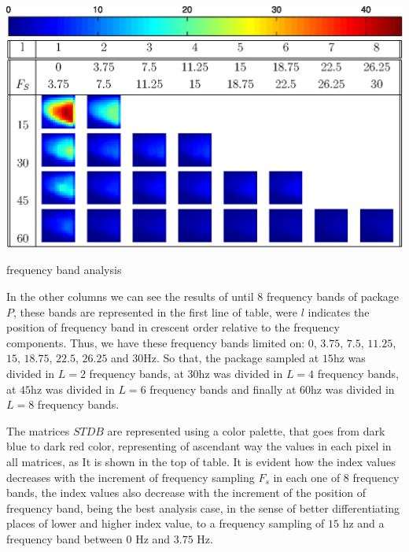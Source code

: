 \documentclass[review]{elsarticle}
\begin{document}
\begin{table}[h!]
\includegraphics[width=\textwidth]{colorbar.eps}
\includegraphics[width=\textwidth]{freq1.eps}
\caption{frequency band analysis}
\label{table:2}
\end{table}
In the other columns we can see the results of until $8$ frequency bands of package $P$,
these bands are represented in the first line of table, were $l$ indicates the position of frequency band
in crescent order relative to the frequency components. Thus, we have 
these frequency bands limited on: $0$, $3.75$, $7.5$, $11.25$, $15$, $18.75$, $22.5$, $26.25$ and $30$Hz.
So that, the package sampled at $15$hz was divided in $L=2$ frequency bands, 
at $30$hz was divided in $L=4$ frequency bands, 
at $45$hz was divided in $L=6$ frequency bands and finally
at $60$hz was divided in $L=8$ frequency bands.

The matrices $STDB$ are represented using a color palette, 
that goes from dark blue to dark red color, 
representing of ascendant way the values in each pixel in all matrices, 
as It is shown in the top of table. 
It is evident how the index values decreases with
the increment of frequency sampling $F_s$ in each one of 8 frequency bands, 
the index values also decrease with the increment of the position of frequency band,
being the best analysis case, 
in the sense of better differentiating places of lower and higher index value, 
to a frequency sampling of $15$ hz and a frequency band between $0$ Hz and $3.75$ Hz. 




\end{document}
